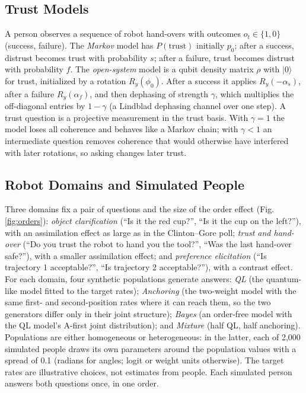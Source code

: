\subsection{Trust Models}\label{sec:trustmodels}
A person observes a sequence of robot hand-overs with outcomes $o_t\in\{1,0\}$ (success, failure). The \textit{Markov} model has $P(\text{trust})$ initially $p_0$; after a success, distrust becomes trust with probability $s$; after a failure, trust becomes distrust with probability $f$. The \textit{open-system} model is a qubit density matrix $\rho$ with $|0\rangle$ for trust, initialized by a rotation $R_y(\phi_0)$. After a success it applies $R_y(-\alpha_s)$, after a failure $R_y(\alpha_f)$, and then dephasing of strength $\gamma$, which multiplies the off-diagonal entries by $1-\gamma$ (a Lindblad dephasing channel over one step). A trust question is a projective measurement in the trust basis. With $\gamma=1$ the model loses all coherence and behaves like a Markov chain; with $\gamma<1$ an intermediate question removes coherence that would otherwise have interfered with later rotations, so asking changes later trust.

\subsection{Robot Domains and Simulated People}\label{sec:domains}
Three domains fix a pair of questions and the size of the order effect (Fig. \ref{fig:orders}): \textit{object clarification} (``Is it the red cup?'', ``Is it the cup on the left?''), with an assimilation effect as large as in the Clinton--Gore poll; \textit{trust and hand-over} (``Do you trust the robot to hand you the tool?'', ``Was the last hand-over safe?''), with a smaller assimilation effect; and \textit{preference elicitation} (``Is trajectory 1 acceptable?'', ``Is trajectory 2 acceptable?''), with a contrast effect. For each domain, four synthetic populations generate answers: \textit{QL} (the quantum-like model fitted to the target rates); \textit{Anchoring} (the two-weight model with the same first- and second-position rates where it can reach them, so the two generators differ only in their joint structure); \textit{Bayes} (an order-free model with the QL model's A-first joint distribution); and \textit{Mixture} (half QL, half anchoring). Populations are either homogeneous or heterogeneous: in the latter, each of 2,000 simulated people draws its own parameters around the population values with a spread of 0.1 (radians for angles; logit or weight units otherwise). The target rates are illustrative choices, not estimates from people. Each simulated person answers both questions once, in one order.

